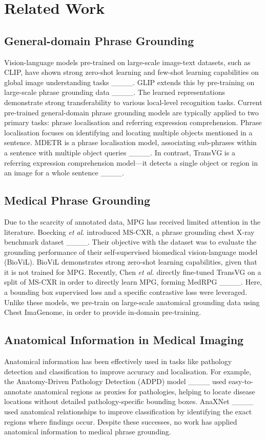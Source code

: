 \section{Related Work}
\subsection{General-domain Phrase Grounding}
Vision-language models pre-trained on large-scale image-text datasets, such as CLIP, have shown strong zero-shot learning and few-shot learning capabilities on global image understanding tasks ____. GLIP extends this by pre-training on large-scale phrase grounding data ____. The learned representations demonstrate strong transferability to various local-level recognition tasks. Current pre-trained general-domain phrase grounding models are typically applied to two primary tasks: phrase localisation and referring expression comprehension. Phrase localisation focuses on identifying and locating multiple objects mentioned in a sentence. MDETR is a phrase localisation model, associating sub-phrases within a sentence with multiple object queries ____. In contrast, TransVG is a referring expression comprehension model---it detects a single object or region in an image for a whole sentence ____.

\subsection{Medical Phrase Grounding}
Due to the scarcity of annotated data, MPG has received limited attention in the literature. Boecking \textit{et al.} introduced MS-CXR, a phrase grounding chest X-ray benchmark dataset ____. Their objective with the dataset was to evaluate the grounding performance of their self-supervised biomedical vision-language model (BioViL). BioViL demonstrates strong zero-shot learning capabilities, given that it is not trained for MPG. Recently, Chen \textit{et al.} directly fine-tuned TransVG on a split of MS-CXR in order to directly learn MPG, forming MedRPG ____. Here, a bounding box supervised loss and a specific contrastive loss were leveraged. Unlike these models, we pre-train on large-scale anatomical grounding data using Chest ImaGenome, in order to provide in-domain pre-training.

\subsection{Anatomical Information in Medical Imaging}
Anatomical information has been effectively used in tasks like pathology detection and classification to improve accuracy and localisation. For example, the Anatomy-Driven Pathology Detection (ADPD) model ____ used easy-to-annotate anatomical regions as proxies for pathologies, helping to locate disease locations without detailed pathology-specific bounding boxes. AnaXNet ____ used anatomical relationships to improve classification by identifying the exact regions where findings occur. Despite these successes, no work has applied anatomical information to medical phrase grounding.